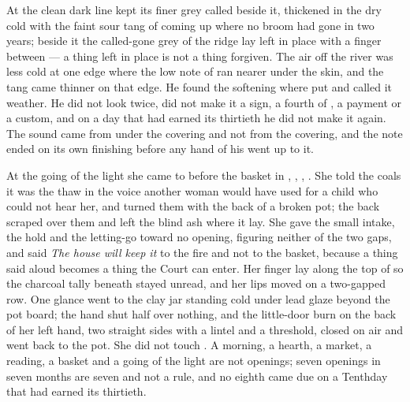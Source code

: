 At  the clean dark line kept its finer grey called  beside it, thickened in the dry cold with the faint sour tang of  coming up where no broom had gone in two years; beside it the called-gone grey of the ridge lay left in place with a finger between --- a thing left in place is not a thing forgiven. The air off the river was less cold at one edge where the low note of  ran nearer under the skin, and the tang came thinner on that edge. He found the softening where put and called it weather. He did not look twice, did not make it a sign, a fourth of , a payment or a custom, and on a day that had earned its thirtieth he did not make it again. The sound came from under the covering and not from the covering, and the note ended on its own finishing before any hand of his went up to it.

At the going of the light she came to  before the basket in , , , . She told the coals it was the thaw in the voice another woman would have used for a child who could not hear her, and turned them with the back of a broken pot; the back scraped over them and left the blind ash where it lay. She gave the small intake, the hold and the letting-go toward no opening, figuring neither of the two gaps, and said \emph{The house will keep it} to the fire and not to the basket, because a thing said aloud becomes a thing the Court can enter. Her finger lay along the top of  so the charcoal tally beneath stayed unread, and her lips moved on a two-gapped row. One glance went to the clay jar standing cold under lead glaze beyond the pot board; the hand shut half over nothing, and the little-door burn on the back of her left hand, two straight sides with a lintel and a threshold, closed on air and went back to the pot. She did not touch . A morning, a hearth, a market, a reading, a basket and a going of the light are not openings; seven openings in seven months are seven and not a rule, and no eighth came due on a Tenthday that had earned its thirtieth.

